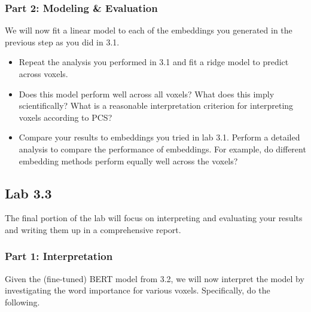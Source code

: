 \documentclass[letterpaper,12pt]{article}
\begin{document}

\subsubsection{Part 2: Modeling \& Evaluation }

We will now fit a linear model to each of the embeddings you generated in the previous step as you did in 3.1.

\begin{itemize}
    \item Repeat the analysis you performed in 3.1 and fit a ridge model to predict across voxels.
    \item Does this model perform well across all voxels? What does this imply scientifically? What is a reasonable interpretation criterion for interpreting voxels according to PCS?
    \item Compare your results to embeddings you tried in lab 3.1. Perform a detailed analysis to compare the performance of embeddings. For example, do different embedding methods perform equally well across the voxels?
\end{itemize}

\clearpage
\subsection{Lab 3.3}

The final portion of the lab will focus on interpreting and evaluating your results and writing them up in a comprehensive report. 

\subsubsection{Part 1: Interpretation}
Given the (fine-tuned) BERT model from 3.2, we will now interpret the model by investigating the word importance for various voxels. Specifically, do the following.
\end{document}
